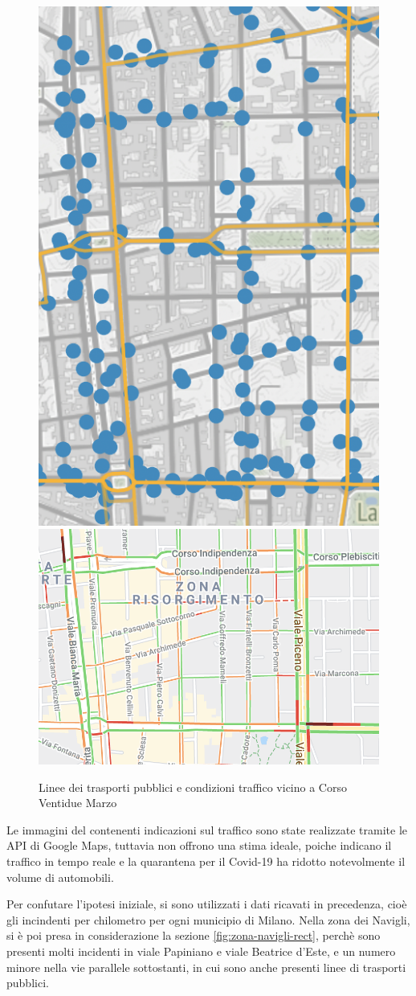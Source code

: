 \documentclass[a4paper,12pt]{report}
\begin{document}
\begin{figure}
    \includegraphics[width=0.25\linewidth]{../src/atm/22_marzo.png}
    \includegraphics[width=0.55\linewidth]{img/22_marzo.png}
    \caption{Linee dei trasporti pubblici e condizioni traffico vicino a Corso Ventidue Marzo}
    \label{fig:22-marzo}
\end{figure}

Le immagini del contenenti indicazioni sul traffico sono state realizzate tramite le API di 
Google Maps, tuttavia non offrono una stima ideale, poiche indicano il traffico in tempo reale e 
la quarantena per il Covid-19 ha ridotto notevolmente il volume di automobili.

Per confutare l'ipotesi iniziale, si sono utilizzati i dati ricavati in precedenza, 
cioè gli incindenti per chilometro per ogni municipio di Milano. 
Nella zona dei Navigli, si è poi presa in considerazione la sezione \ref{fig:zona-navigli-rect}, 
perchè sono presenti molti incidenti in viale Papiniano e viale Beatrice d'Este, 
e un numero minore nella vie parallele sottostanti, in cui sono anche presenti 
linee di trasporti pubblici.
\end{document}
